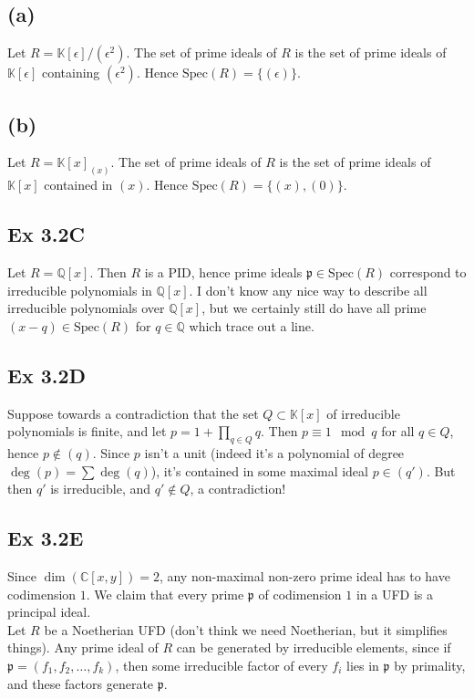 \documentclass{article}
\theoremstyle{definition}
\newcommand{\Q}{\mathbb{Q}}
\newcommand{\C}{\mathbb{C}}
\newcommand{\K}{\mathbb{K}}
\newcommand{\Spec}{\text{Spec}}
\begin{document}
\subsection*{(a)}

Let $R = \K[\epsilon]/(\epsilon^2)$. The set of prime ideals of $R$ is the set
of prime ideals of $\K[\epsilon]$ containing $(\epsilon^2)$. Hence $\Spec(R) =
\{(\epsilon)\}$.

\subsection*{(b)}

Let $R = \K[x]_{(x)}$. The set of prime ideals of $R$ is the set of prime
ideals of $\K[x]$ contained in $(x)$. Hence $\Spec(R) = \{(x), (0)\}$.


\subsection*{Ex 3.2C}

Let $R = \Q[x]$. Then $R$ is a PID, hence prime ideals $\mathfrak{p} \in
\Spec(R)$ correspond to irreducible polynomials in $\Q[x]$. I don't know any
nice way to describe all irreducible polynomials over $\Q[x]$, but we certainly
still do have all prime $(x - q) \in \Spec(R)$ for $q \in \Q$ which trace out a
line.

\subsection*{Ex 3.2D}

Suppose towards a contradiction that the set $Q \subset \K[x]$ of irreducible
polynomials is finite, and let $p = 1 + \prod_{q \in Q} q$. Then $p \equiv 1
\mod q$ for all $q \in Q$, hence $p \not \in (q)$. Since $p$ isn't a unit
(indeed it's a polynomial of degree $\deg(p) = \sum \deg(q)$), it's contained
in some maximal ideal $p \in (q')$. But then $q'$ is irreducible, and $q' \not
\in Q$, a contradiction!


\subsection*{Ex 3.2E}

Since $\dim(\C[x, y]) = 2$, any non-maximal non-zero prime ideal has to have
codimension $1$. We claim that every prime $\mathfrak{p}$ of codimension $1$
in a UFD is a principal ideal. \\ 

Let $R$ be a Noetherian UFD (don't think we need Noetherian, but it simplifies
things). Any prime ideal of $R$ can be generated by irreducible elements, since
if $\mathfrak{p} = (f_1, f_2, \ldots, f_k)$, then some irreducible factor of
every $f_i$ lies in $\mathfrak{p}$ by primality, and these factors generate
$\mathfrak{p}$. \\
\end{document}
